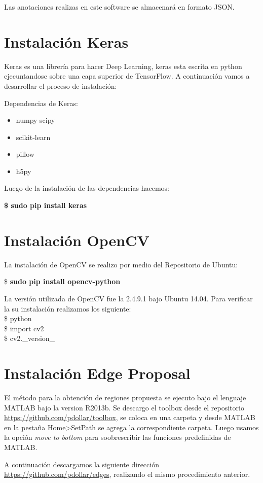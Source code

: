 Las anotaciones realizas en este software se almacenará en formato JSON.

\section{Instalación Keras}\label{sec:instalacionkeras}
Keras es una librería para hacer Deep Learning, keras esta escrita en python ejecuntandose sobre una capa superior de TensorFlow. A continuación vamos a desarrollar el proceso de instalación:

Dependencias de Keras:
\begin{itemize}
\item numpy scipy
\item scikit-learn
\item pillow
\item h5py
\end{itemize}
Luego de la instalación de las dependencias hacemos:

 \textbf{\$ sudo pip install keras}
\section{Instalación OpenCV}\label{sec:instalacionopencv}
La instalación de OpenCV se realizo por medio del Repositorio de Ubuntu:

\$\textbf{ sudo pip install opencv-python}

La versión utilizada de OpenCV fue la 2.4.9.1 bajo Ubuntu 14.04. Para verificar la su instalación realizamos los siguiente:\\
\$ python\\
\$ import cv2\\
\$ cv2.\_version\_


\section{Instalación Edge Proposal }\label{sec:instalacionedge}
El método para la obtención de regiones propuesta se ejecuto bajo el lenguaje MATLAB bajo la version R2013b. Se descargo el toolbox desde el repositorio \url{https://github.com/pdollar/toolbox}, se coloca en una carpeta y desde MATLAB en la pestaña Home>SetPath se agrega la correspondiente carpeta. Luego usamos la opción \textit{move to bottom} para soobrescribir las funciones predefinidas de MATLAB.

A continuación descargamos la siguiente dirección \url{https://github.com/pdollar/edges}, realizando el mismo procedimiento anterior.

